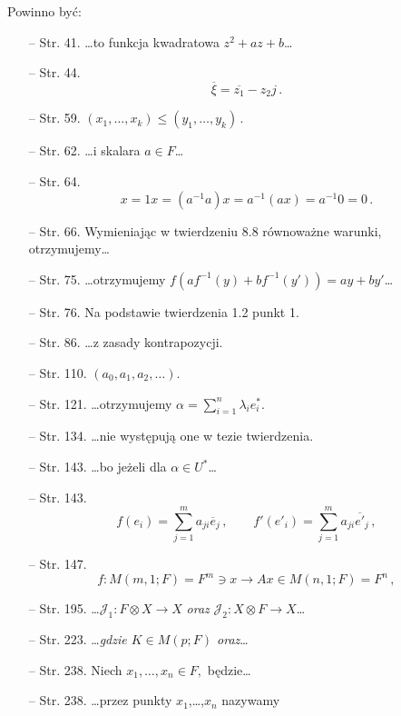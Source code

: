 \documentclass[a4paper,11pt]{article}
\begin{document}
\vspace{\spaceTwo}


Powinno być:
\begin{itemize}
\item[--] Str. 41. \ldots to funkcja kwadratowa $z^2+az+b$\ldots

\item[--] Str. 44.
  $$\overline{ \xi } = \overline{ z_{ 1 } } - z_{ 2 } j \, .$$

\item[--] Str. 59.
  $( x_{ 1 }, \ldots, x_{ k } ) \leq (y_{ 1 }, \ldots, y_{ k } ) \, .$
\item[--] Str. 62. \ldots i skalara $a \in F$\ldots
\item[--] Str. 64.
  $$x = 1 x = ( a^{ -1 } a ) x = a^{ -1 }( a x ) = a^{ -1 } 0 = 0 \,
  .$$
\item[--] Str. 66. Wymieniając w twierdzeniu 8.8 równoważne warunki,
  otrzymujemy\ldots
\item[--] Str. 75. \ldots otrzymujemy
  $f( a f^{ -1 }( y ) + b f^{ -1 } ( y' ) ) = a y + b y'$\ldots
\item[--] Str. 76. Na podstawie twierdzenia 1.2 punkt 1.
\item[--] Str. 86. \ldots z zasady kontrapozycji.
\item[--] Str. 110. $( a_{ 0 }, a_{ 1 }, a_{ 2 }, \ldots )$.
\item[--] Str. 121. \ldots otrzymujemy
  $\alpha = \sum_{ i = 1 }^{ n } \lambda_{ i } e^{ * }_{ i } .$
\item[--] Str. 134. \ldots nie występują one w tezie twierdzenia.
\item[--] Str. 143. \ldots bo jeżeli dla $\alpha \in U^{ * }$\ldots
\item[--] Str. 143.
  $$f( e_{ i } ) = \sum_{ j = 1 }^{ m } a_{ j i } \overline{ { e } }_{
    j } \, , \qquad f'( e'_{ i } ) = \sum_{ j = 1 }^{ m } a_{ j i } \overline{
    { e }' }_{ j } \, ,$$
\item[--] Str. 147.
  $$f : M( m, 1; F ) = F^{ m } \ni x \longrightarrow A x \in M( n, 1 ;
  F ) = F^{ n } \, ,$$
\item[--] Str. 195.
  \ldots$\mathcal{ J }_{ 1 } : F \otimes X \rightarrow X$ \emph{oraz}
  $\mathcal{ J }_{ 2 } : X \otimes F \rightarrow X$\ldots
\item[--] Str. 223. \ldots\emph{gdzie $K \in M( p; F )$ oraz}\ldots
\item[--] Str. 238. Niech $x_{ 1 }, \ldots, x_{ n } \in F ,$ będzie\ldots
\item[--] Str. 238. \ldots przez punkty $x_{ 1 }$,\ldots,$x_{ n }$ nazywamy

\end{itemize}
\end{document}
